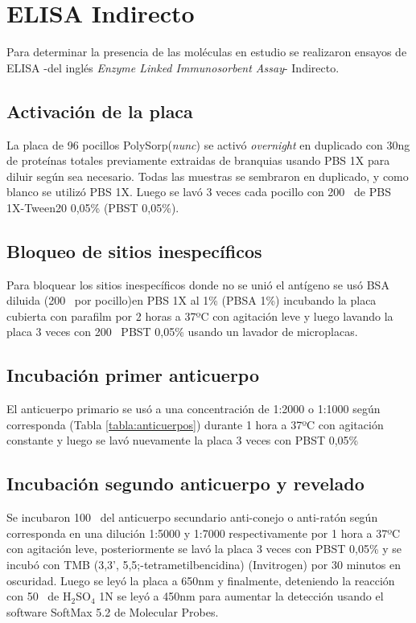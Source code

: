 \documentclass[12pt,a4paper,oneside]{scrbook}
\newcommand{\subindice}[1]{$_{\text{#1}}$}
\begin{document}
\section{ELISA Indirecto}

Para determinar la presencia de las moléculas en estudio se realizaron
ensayos de ELISA -del inglés \emph{Enzyme Linked Immunosorbent Assay}-
Indirecto.

\subsection{Activación de la placa}

La placa de 96 pocillos
PolySorp\textregistered (\emph{nunc\texttrademark}) se activó
\emph{overnight} en duplicado con 30ng de proteínas totales previamente
extraidas de branquias usando PBS 1X para diluir según sea necesario.
Todas las muestras se sembraron en duplicado, y como blanco se utilizó
PBS 1X. Luego se lavó 3 veces cada pocillo con 200\si{\micro\litro} de
PBS 1X-Tween20 0,05\% (PBST 0,05\%).

\subsection{Bloqueo de sitios inespecíficos}

Para bloquear los sitios inespecíficos donde no se unió el antígeno se
usó BSA diluida (200\si{\micro\litro} por pocillo)en PBS 1X al 1\% (PBSA
1\%) incubando la placa cubierta con parafilm por 2 horas a 37ºC con
agitación leve y luego lavando la placa 3 veces con 200\si{\micro\litro}
PBST 0,05\% usando un lavador de microplacas.

\subsection{Incubación primer anticuerpo}

El anticuerpo primario se usó a una concentración de 1:2000 o 1:1000
según corresponda (Tabla \ref{tabla:anticuerpos}) durante 1 hora a 37ºC
con agitación constante y luego se lavó nuevamente la placa 3 veces con
PBST 0,05\%

\subsection{Incubación segundo anticuerpo y revelado}

Se incubaron 100\si{\micro\litro} del anticuerpo secundario anti-conejo
o anti-ratón según corresponda en una dilución 1:5000 y 1:7000
respectivamente por 1 hora a 37ºC con agitación leve, posteriormente se
lavó la placa 3 veces con PBST 0,05\% y se incubó con TMB (3,3',
5,5;-tetrametilbencidina) (Invitrogen) por 30 minutos en oscuridad.
Luego se leyó la placa a 650nm y finalmente, deteniendo la reacción con
50\si{\micro\litro} de H\subindice{2}SO\subindice{4} 1N se leyó a 450nm
para aumentar la detección usando el software SoftMax 5.2 de Molecular
Probes.
\end{document}
